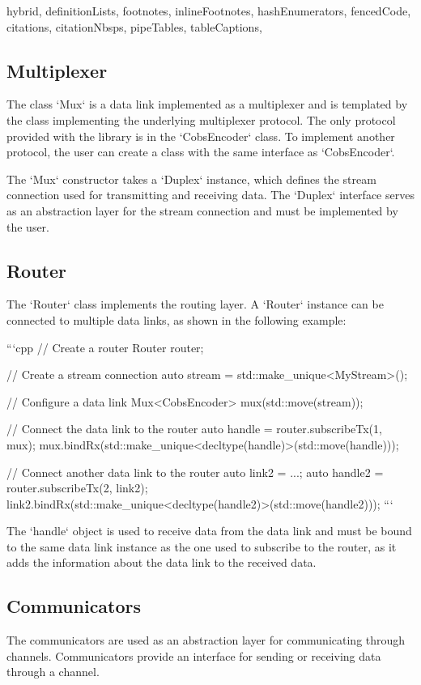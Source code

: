 \begin{markdown*}{%
  hybrid,
  definitionLists,
  footnotes,
  inlineFootnotes,
  hashEnumerators,
  fencedCode,
  citations,
  citationNbsps,
  pipeTables,
  tableCaptions,
}
\subsection{Multiplexer}

The class `Mux` is a data link implemented as a multiplexer and is templated by the class implementing the underlying multiplexer protocol. The only protocol provided with the library is in the `CobsEncoder` class. To implement another protocol, the user can create a class with the same interface as `CobsEncoder`.

The `Mux` constructor takes a `Duplex` instance, which defines the stream connection used for transmitting and receiving data. The `Duplex` interface serves as an abstraction layer for the stream connection and must be implemented by the user.

\subsection{Router}

The `Router` class implements the routing layer. A `Router` instance can be connected to multiple data links, as shown in the following example:

```cpp
// Create a router
Router router;

// Create a stream connection
auto stream = std::make_unique<MyStream>();

// Configure a data link
Mux<CobsEncoder> mux(std::move(stream));

// Connect the data link to the router
auto handle = router.subscribeTx(1, mux);
mux.bindRx(std::make_unique<decltype(handle)>(std::move(handle)));

// Connect another data link to the router
auto link2 = ...;
auto handle2 = router.subscribeTx(2, link2);
link2.bindRx(std::make_unique<decltype(handle2)>(std::move(handle2)));
```

The `handle` object is used to receive data from the data link and must be bound to the same data link instance as the one used to subscribe to the router, as it adds the information about the data link to the received data.

\subsection{Communicators}

The communicators are used as an abstraction layer for communicating through channels. Communicators provide an interface for sending or receiving data through a channel.


\end{markdown*}
